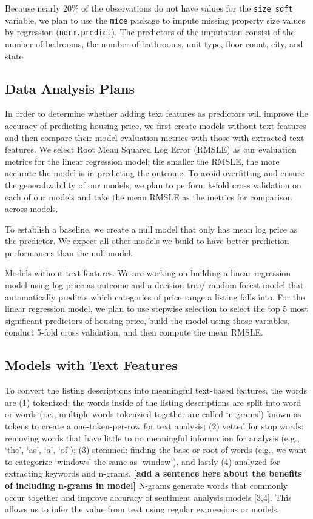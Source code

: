 \documentclass[10pt,letterpaper]{article}
\begin{document}
Because nearly 20\% of the observations do not have values for the
\texttt{size\_sqft} variable, we plan to use the \texttt{mice} package
to impute missing property size values by regression
(\texttt{norm.predict}). The predictors of the imputation consist of the
number of bedrooms, the number of bathrooms, unit type, floor count,
city, and state.

\hypertarget{data-analysis-plans}{%
\subsection{Data Analysis Plans}\label{data-analysis-plans}}

In order to determine whether adding text features as predictors will
improve the accuracy of predicting housing price, we first create models
without text features and then compare their model evaluation metrics
with those with extracted text features. We select Root Mean Squared Log
Error (RMSLE) as our evaluation metrics for the linear regression model;
the smaller the RMSLE, the more accurate the model is in predicting the
outcome. To avoid overfitting and ensure the generalizability of our
models, we plan to perform k-fold cross validation on each of our models
and take the mean RMSLE as the metrics for comparison across models.

To establish a baseline, we create a null model that only has mean log
price as the predictor. We expect all other models we build to have
better prediction performances than the null model.

Models without text features. We are working on building a linear
regression model using log price as outcome and a decision tree/ random
forest model that automatically predicts which categories of price range
a listing falls into. For the linear regression model, we plan to use
stepwise selection to select the top 5 most significant predictors of
housing price, build the model using those variables, conduct 5-fold
cross validation, and then compute the mean RMSLE.

\hypertarget{models-with-text-features}{%
\subsection{Models with Text Features}\label{models-with-text-features}}

To convert the listing descriptions into meaningful text-based features,
the words are (1) tokenized: the words inside of the listing
descriptions are split into word or words (i.e., multiple words
tokenzied together are called `n-grams') known as tokens to create a
one-token-per-row for text analysis; (2) vetted for stop words: removing
words that have little to no meaningful information for analysis (e.g.,
`the', `as', `a', `of'); (3) stemmed: finding the base or root of words
(e.g., we want to categorize `windows' the same as `window'), and lastly
(4) analyzed for extracting keywords and n-grams. \textbf{{[}add a
sentence here about the benefits of including n-grams in model{]}}
N-grams generate words that commonly occur together and improve accuracy
of sentiment analysis models {[}3,4{]}. This allows us to infer the
value from text using regular expressions or models.
\end{document}
